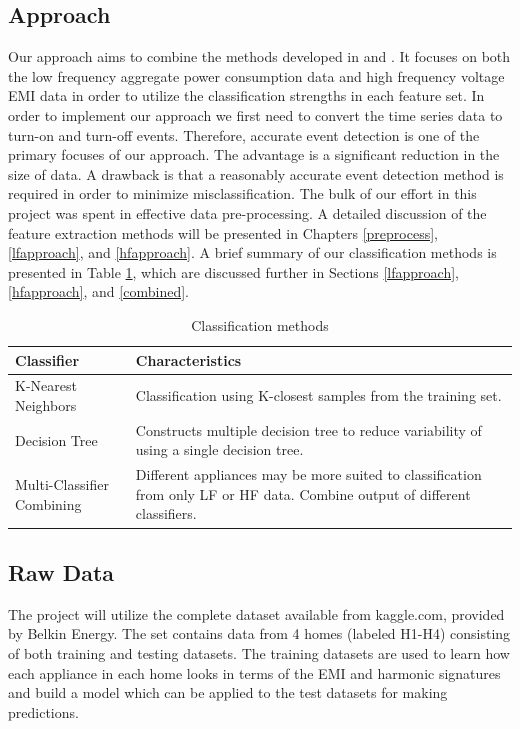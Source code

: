 \documentclass[11pt, letterpaper]{article}
\begin{document}
\subsection{Approach}

Our approach aims to combine the methods developed in \cite{EMI} and \cite{mit}. It focuses on both the low frequency aggregate power consumption data and high frequency voltage EMI data in order to utilize the classification strengths in each feature set.  In order to implement our approach we first need to convert the time series data to turn-on and turn-off events.  Therefore, accurate event detection is one of the primary focuses of our approach.  The advantage is a significant reduction in the size of data.  A drawback is that a reasonably accurate event detection method is required in order to minimize misclassification. The bulk of our effort in this project was spent in effective data pre-processing. A detailed discussion of the feature extraction methods will be presented in Chapters \ref{preprocess}, \ref{lfapproach}, and \ref{hfapproach}.  A brief summary of our classification methods is presented in Table \ref{classifiers}, which are discussed further in Sections \ref{lfapproach},  \ref{hfapproach}, and \ref{combined}. 

\begin{table}[h]
\caption{Classification methods}\label{classifiers}
\begin{center}
\begin{tabular}{|p{4.2cm}|p{11cm}|}\hline
\textbf{Classifier} & \textbf{Characteristics}\\
\hline
K-Nearest Neighbors & Classification using K-closest samples from the training set. \\
\hline
Decision Tree & Constructs multiple decision tree to reduce variability of using a single decision tree.	\\
\hline
Multi-Classifier Combining & Different appliances may be more suited to classification from only LF or HF data.  Combine output of different classifiers.\\
\hline

\end{tabular}
\end{center}
\end{table}


\subsection{Raw Data}
The project will utilize the complete dataset available from kaggle.com, provided by Belkin Energy. The set contains data from 4 homes (labeled H1-H4) consisting of both training and testing datasets. The training datasets are used to learn how each appliance in each home looks in terms of the EMI and harmonic signatures and build a model which can be applied to the test datasets for making predictions.  
\end{document}
